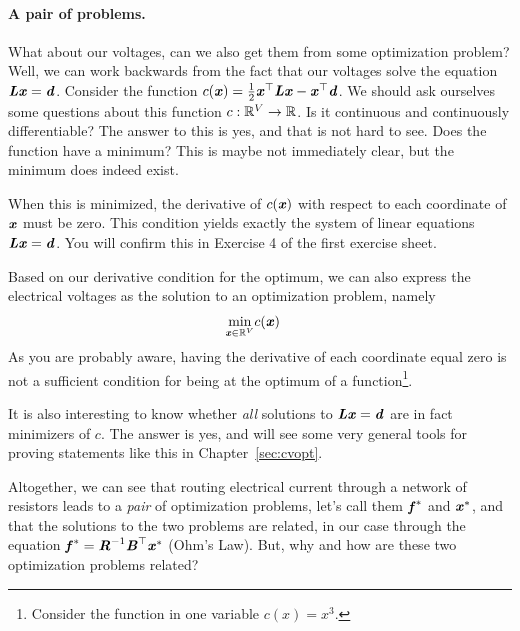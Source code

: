 \paragraph{A pair of problems.}
What about our voltages, can we also get them from some optimization
problem?
%
Well, we can work backwards from the fact that our voltages solve the
equation $\boldsymbol{\mathit{L}} \boldsymbol{\mathit{x}} = \boldsymbol{\mathit{d}}$.
%
Consider the function $c(\boldsymbol{\mathit{x}}) = \frac{1}{2} \boldsymbol{\mathit{x}}^{\top} \boldsymbol{\mathit{L}} \boldsymbol{\mathit{x}} -
\boldsymbol{\mathit{x}}^{\top}\boldsymbol{\mathit{d}}$.
We should ask ourselves some questions about this function $c : \mathbb{R}^V
\to \mathbb{R}$. Is it continuous and continuously differentiable? The answer to this is
yes, and that is not hard to see.
Does the function have a minimum?
This is maybe not immediately clear, but the minimum does indeed exist.

When this is minimized, the derivative of $c(\boldsymbol{\mathit{x}})$ with respect to each coordinate of $\boldsymbol{\mathit{x}}$
must be zero. This condition yields exactly the system of linear
equations $\boldsymbol{\mathit{L}} \boldsymbol{\mathit{x}} = \boldsymbol{\mathit{d}}$.
You will confirm this in Exercise 4 of the first exercise sheet.

Based on our derivative condition for the optimum, we can also express the electrical voltages as the solution to
an optimization problem, namely
\begin{align*}
\min_{\boldsymbol{\mathit{x}} \in \mathbb{R}^V} & c(\boldsymbol{\mathit{x}})
\end{align*}
As you are probably aware, having the derivative of each coordinate equal zero is not a
sufficient condition for being at the optimum of a
function\footnote{Consider the function in one variable $c(x) =
  x^3$.}.

It is also interesting to know whether \emph{all} solutions to $\boldsymbol{\mathit{L}}
\boldsymbol{\mathit{x}} = \boldsymbol{\mathit{d}}$ are in fact minimizers of $c$. The answer is
yes, and will see some very general tools for proving statements like
this in Chapter~\ref{sec:cvopt}.

Altogether, we can see that routing electrical current through a
network of resistors leads to a \emph{pair} of optimization problems,
let's call them $\boldsymbol{\mathit{f}}^*$ and $\boldsymbol{\mathit{x}}^*$,
and that the solutions to the two problems are related, in our case
through the equation $\boldsymbol{\mathit{f}}^* = \boldsymbol{\mathit{R}}^{-1}\boldsymbol{\mathit{B}}^{\top} \boldsymbol{\mathit{x}}^*$ (Ohm's Law).
But, why and how are these two optimization problems related?


